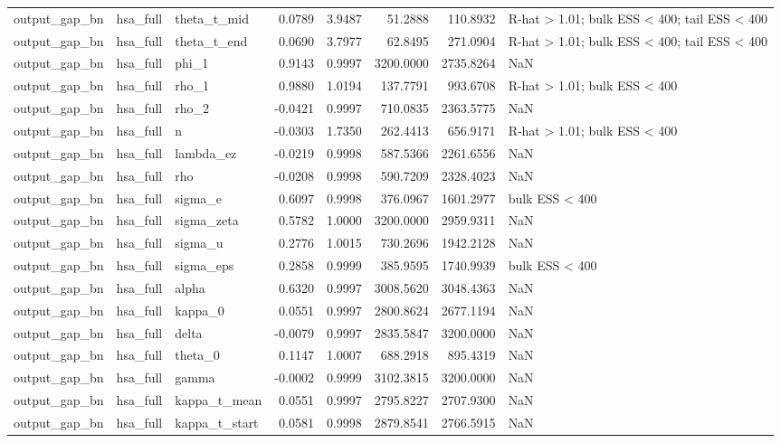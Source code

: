 \begin{tabular}{lllrrrrl}
output\_gap\_bn & hsa\_full & theta\_t\_mid & 0.0789 & 3.9487 & 51.2888 & 110.8932 & R-hat > 1.01; bulk ESS < 400; tail ESS < 400 \\
output\_gap\_bn & hsa\_full & theta\_t\_end & 0.0690 & 3.7977 & 62.8495 & 271.0904 & R-hat > 1.01; bulk ESS < 400; tail ESS < 400 \\
output\_gap\_bn & hsa\_full & phi\_1 & 0.9143 & 0.9997 & 3200.0000 & 2735.8264 & NaN \\
output\_gap\_bn & hsa\_full & rho\_1 & 0.9880 & 1.0194 & 137.7791 & 993.6708 & R-hat > 1.01; bulk ESS < 400 \\
output\_gap\_bn & hsa\_full & rho\_2 & -0.0421 & 0.9997 & 710.0835 & 2363.5775 & NaN \\
output\_gap\_bn & hsa\_full & n & -0.0303 & 1.7350 & 262.4413 & 656.9171 & R-hat > 1.01; bulk ESS < 400 \\
output\_gap\_bn & hsa\_full & lambda\_ez & -0.0219 & 0.9998 & 587.5366 & 2261.6556 & NaN \\
output\_gap\_bn & hsa\_full & rho & -0.0208 & 0.9998 & 590.7209 & 2328.4023 & NaN \\
output\_gap\_bn & hsa\_full & sigma\_e & 0.6097 & 0.9998 & 376.0967 & 1601.2977 & bulk ESS < 400 \\
output\_gap\_bn & hsa\_full & sigma\_zeta & 0.5782 & 1.0000 & 3200.0000 & 2959.9311 & NaN \\
output\_gap\_bn & hsa\_full & sigma\_u & 0.2776 & 1.0015 & 730.2696 & 1942.2128 & NaN \\
output\_gap\_bn & hsa\_full & sigma\_eps & 0.2858 & 0.9999 & 385.9595 & 1740.9939 & bulk ESS < 400 \\
output\_gap\_bn & hsa\_full & alpha & 0.6320 & 0.9997 & 3008.5620 & 3048.4363 & NaN \\
output\_gap\_bn & hsa\_full & kappa\_0 & 0.0551 & 0.9997 & 2800.8624 & 2677.1194 & NaN \\
output\_gap\_bn & hsa\_full & delta & -0.0079 & 0.9997 & 2835.5847 & 3200.0000 & NaN \\
output\_gap\_bn & hsa\_full & theta\_0 & 0.1147 & 1.0007 & 688.2918 & 895.4319 & NaN \\
output\_gap\_bn & hsa\_full & gamma & -0.0002 & 0.9999 & 3102.3815 & 3200.0000 & NaN \\
output\_gap\_bn & hsa\_full & kappa\_t\_mean & 0.0551 & 0.9997 & 2795.8227 & 2707.9300 & NaN \\
output\_gap\_bn & hsa\_full & kappa\_t\_start & 0.0581 & 0.9998 & 2879.8541 & 2766.5915 & NaN \\

\end{tabular}
